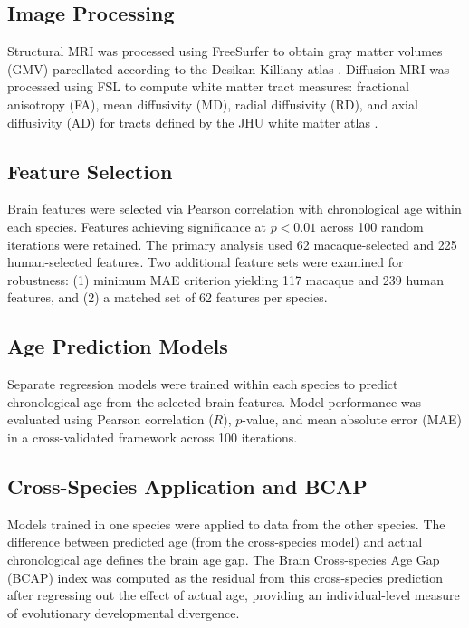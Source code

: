 \documentclass[12pt]{article}
\begin{document}
\subsection{Image Processing}

Structural MRI was processed using FreeSurfer \citep{fischl2012freesurfer} to obtain gray matter volumes (GMV) parcellated according to the Desikan-Killiany atlas \citep{desikan2006automated}. Diffusion MRI was processed using FSL \citep{jenkinson2012fsl} to compute white matter tract measures: fractional anisotropy (FA), mean diffusivity (MD), radial diffusivity (RD), and axial diffusivity (AD) for tracts defined by the JHU white matter atlas \citep{mori2005mri}.

\subsection{Feature Selection}

Brain features were selected via Pearson correlation with chronological age within each species. Features achieving significance at $p < 0.01$ across 100 random iterations were retained. The primary analysis used 62 macaque-selected and 225 human-selected features. Two additional feature sets were examined for robustness: (1) minimum MAE criterion yielding 117 macaque and 239 human features, and (2) a matched set of 62 features per species.

\subsection{Age Prediction Models}

Separate regression models were trained within each species to predict chronological age from the selected brain features. Model performance was evaluated using Pearson correlation ($R$), $p$-value, and mean absolute error (MAE) in a cross-validated framework across 100 iterations.

\subsection{Cross-Species Application and BCAP}

Models trained in one species were applied to data from the other species. The difference between predicted age (from the cross-species model) and actual chronological age defines the brain age gap. The Brain Cross-species Age Gap (BCAP) index was computed as the residual from this cross-species prediction after regressing out the effect of actual age, providing an individual-level measure of evolutionary developmental divergence.
\end{document}
